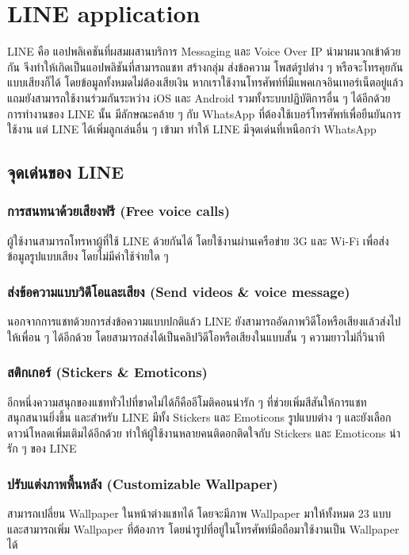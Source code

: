 \section{LINE application}
\quad LINE คือ แอปพลิเคชันที่ผสมผสานบริการ Messaging และ Voice Over IP นำมาผนวกเข้าด้วยกัน จึงทำให้เกิดเป็นแอปพลิชันที่สามารถแชท สร้างกลุ่ม ส่งข้อความ โพสต์รูปต่าง ๆ  หรือจะโทรคุยกันแบบเสียงก็ได้  โดยข้อมูลทั้งหมดไม่ต้องเสียเงิน หากเราใช้งานโทรศัพท์ที่มีแพคเกจอินเทอร์เน็ตอยู่แล้ว แถมยังสามารถใช้งานร่วมกันระหว่าง iOS และ Android รวมทั้งระบบปฏิบัติการอื่น ๆ ได้อีกด้วย การทำงานของ LINE นั้น มีลักษณะคล้าย ๆ กับ WhatsApp ที่ต้องใช้เบอร์โทรศัพท์เพื่อยืนยันการใช้งาน แต่ LINE ได้เพิ่มลูกเล่นอื่น ๆ เข้ามา ทำให้ LINE มีจุดเด่นที่เหนือกว่า WhatsApp  

\subsection{จุดเด่นของ LINE} 
\subsubsection{การสนทนาด้วยเสียงฟรี (Free voice calls)} 
\quad ผู้ใช้งานสามารถโทรหาผู้ที่ใช้ LINE ด้วยกันได้ โดยใช้งานผ่านเครือข่าย 3G และ Wi-Fi เพื่อส่งข้อมูลรูปแบบเสียง โดยไม่มีค่าใช้จ่ายใด ๆ  
\subsubsection{ส่งข้อความแบบวิดีโอและเสียง (Send videos \& voice message)} 
\quad นอกจากการแชทด้วยการส่งข้อความแบบปกติแล้ว LINE ยังสามารถอัดภาพวิดีโอหรือเสียงแล้วส่งไปให้เพื่อน ๆ ได้อีกด้วย โดยสามารถส่งได้เป็นคลิปวิดีโอหรือเสียงในแบบสั้น ๆ ความยาวไม่กี่วินาที   
\subsubsection{สติกเกอร์ (Stickers \& Emoticons)}
\quad อีกหนึ่งความสนุกของแชททั่วไปที่ขาดไม่ได้ก็คืออีโมติคอนน่ารัก ๆ ที่ช่วยเพิ่มสีสันให้การแชทสนุกสนานยิ่งขึ้น และสำหรับ LINE มีทั้ง Stickers และ Emoticons รูปแบบต่าง ๆ และยังเลือกดาวน์โหลดเพิ่มเติมได้อีกด้วย ทำให้ผู้ใช้งานหลายคนติดอกติดใจกับ Stickers และ Emoticons น่ารัก ๆ ของ LINE  
\subsubsection{ปรับแต่งภาพพื้นหลัง (Customizable Wallpaper)}
\quad สามารถเปลี่ยน Wallpaper ในหน้าต่างแชทได้ โดยจะมีภาพ Wallpaper มาให้ทั้งหมด 23 แบบ และสามารถเพิ่ม Wallpaper ที่ต้องการ โดยนำรูปที่อยู่ในโทรศัพท์มือถือมาใช้งานเป็น Wallpaper ได้  
